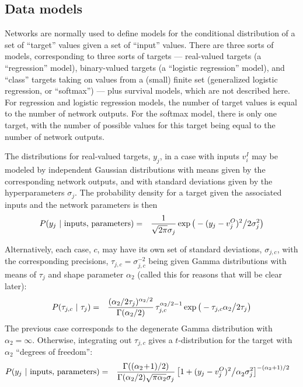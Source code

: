 \documentclass{report}[11pt]
\def\beq{\begin{eqnarray}}
\def\eeq{\end{eqnarray}}
\def\eep{\end{eqnarray}}
\begin{document}
\subsection*{Data models}\label{app-sec-models}

Networks are normally used to define models for the conditional
distribution of a set of ``target'' values given a set of ``input''
values.  There are three sorts of models, corresponding to three sorts
of targets --- real-valued targets (a ``regression'' model),
binary-valued targets (a ``logistic regression'' model), and ``class''
targets taking on values from a (small) finite set (generalized
logistic regression, or ``softmax'') --- plus survival models, which
are not described here.  For regression and logistic regression
models, the number of target values is equal to the number of network
outputs.  For the softmax model, there is only one target, with the
number of possible values for this target being equal to the number of
network outputs.

The distributions for real-valued targets, $y_j$, in a case with inputs 
$v^I_i$ may be modeled by independent Gaussian distributions 
with means given by the corresponding network outputs, and with
standard deviations given by the hyperparameters $\sigma_{j}$.  
The probability density for a target given the associated inputs and
the network parameters is then\beq
  P(y_j\ |\ \mbox{inputs},\, \mbox{parameters}) & = &
    {1 \over \sqrt{2\pi} \sigma_{j}} 
    \exp \big( - (y_j-v^O_j)^2 \big/ 2\sigma_{j}^2 \big)
\label{regg}\eep

Alternatively, each case, $c$, may have its own set of standard
deviations, $\sigma_{j,c}$, with the corresponding precisions,
$\tau_{j,c} = \sigma_{j,c}^{-2}$ being given Gamma distributions with
means of $\tau_{j}$ and shape parameter $\alpha_2$ (called this for
reasons that will be clear later):\beq
  P(\tau_{j,c}\ |\ \tau_{j}) 
   & = & {(\alpha_2/2\tau_j)^{\alpha_2/2} \over \Gamma(\alpha_2/2)}\,
         \tau_{j,c}^{\alpha_2/2-1}
         \exp \big(-\tau_{j,c} \alpha_2 \big/ 2 \tau_{j} \big)
\eeq%
The previous case corresponds to the degenerate Gamma distribution
with $\alpha_2=\infty$.  Otherwise, integrating out $\tau_{j,c}$ gives a 
$t$-distribution for the target with $\alpha_2$ ``degrees of freedom'':\beq
  P(y_j\ |\ \mbox{inputs},\, \mbox{parameters}) & = &
    {\Gamma((\alpha_2\!+\!1)/2) \over \Gamma(\alpha_2/2) 
     \sqrt{\pi\alpha_2}\sigma_j}\,
     \big[ 1 + (y_j-v^O_j)^2\big/\alpha_2^{\ }\sigma_j^2 \big]^{-(\alpha_2+1)/2}
     \ \ \
\label{regt}\eep
\end{document}
